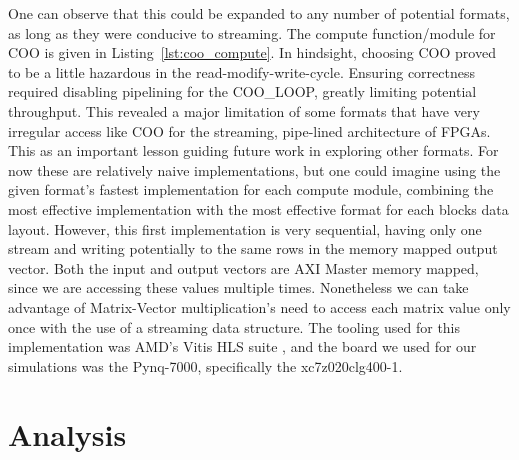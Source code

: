 One can observe that this could be expanded to any number of potential formats, as long as they were conducive to streaming. The compute function/module for COO is given in Listing~\ref{lst:coo_compute}. In hindsight, choosing COO proved to be a little hazardous in the read-modify-write-cycle. Ensuring correctness required disabling pipelining for the COO\_LOOP, greatly limiting potential throughput. This revealed a major limitation of some formats that have very irregular access like COO for the streaming, pipe-lined architecture of FPGAs. This as an important lesson guiding future work in exploring other formats. For now these are relatively naive implementations, but one could imagine using the given format's fastest implementation for each compute module, combining the most effective implementation with the most effective format for each blocks data layout. However, this first implementation is very sequential, having only one stream and writing potentially to the same rows in the memory mapped output vector. Both the input and output vectors are AXI Master memory mapped, since we are accessing these values multiple times. Nonetheless we can take advantage of Matrix-Vector multiplication's need to access each matrix value only once with the use of a streaming data structure.
The tooling used for this implementation was AMD's Vitis HLS suite \cite{xilinx_guide}, and the board we used for our simulations was the Pynq-7000, specifically the xc7z020clg400-1.

\section{Analysis}

